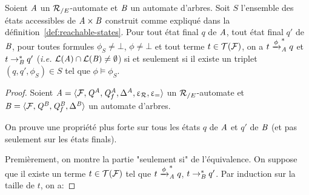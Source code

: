 \begin{lemma}
  Soient $\mathit A$ un ${\mathcal R_{/E}}$-automate et $\mathit B$ un automate d'arbres.
  Soit $S$ l'ensemble des états accessibles de $\mathit A\times \mathit B$ construit
  comme expliqué dans la définition~\ref{def:reachable-states}. 
  Pour tout état final $q$ de $\mathit A$, tout état final $q'$ de $\mathit B$, pour toutes formules $\phi_S\neq\bot$, $\phi\neq \bot$ et
  tout terme $t\in\mathcal{T(F)}$, on a $t\xrightarrow{\phi}^*_\mathit A q$ et $t \rightarrow_\mathit B^* q'$
  (\textit{i.e.} $\mathcal{L}(\mathit A)\cap \mathcal{L}(\mathit B) \neq \emptyset$) si et seulement si il existe un 
  triplet $(q,q',\phi_S)\in S$ tel que $\phi \models \phi_S$. 
\end{lemma}

\begin{proof}
  Soient $\mathit A =\langle \mathcal{F}, \mathit Q^\mathit A,\mathit Q^\mathit A_f,\Delta^\mathit A, \upvarepsilon_{\mathcal R}, \upvarepsilon_{=} \rangle$
  un ${\mathcal R_{/E}}$-automate et $\mathit B=\langle \mathcal{F}, \mathit Q^\mathit B,\mathit Q^\mathit B_f,\Delta^\mathit B \rangle$ un automate d'arbres.  


On prouve une propriété plus forte sur tous les états $q$ de $\mathit A$ et $q'$ de $\mathit B$ 
(et pas seulement sur les états finals).

Premièrement, on montre la partie "seulement si" de l'équivalence.
On suppose que 
il existe un terme $t\in\mathcal{T(F)}$ tel que $t\xrightarrow{\phi}^*_\mathit A q$, $t \rightarrow_\mathit B^* q'$.
Par induction sur la taille de $t$, on a:


\end{proof}

